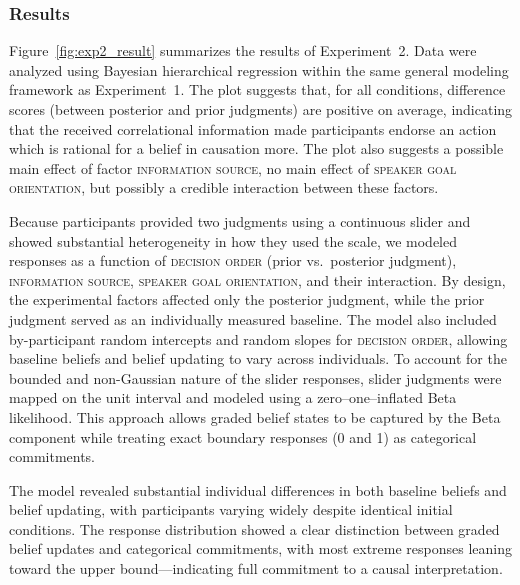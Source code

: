 \documentclass[10pt,letterpaper]{article}
\begin{document}
\subsubsection{Results}



Figure~\ref{fig:exp2_result} summarizes the results of Experiment~2. Data were analyzed using Bayesian hierarchical regression within the same general modeling framework as Experiment~1. 
The plot suggests that, for all conditions, difference scores (between posterior and prior judgments) are positive on average, indicating that the received correlational information made participants endorse an action which is rational for a belief in causation more.
The plot also suggests a possible main effect of factor \textsc{information source}, no main effect of \textsc{speaker goal orientation}, but possibly a credible interaction between these factors.

Because participants provided two judgments using a continuous slider and showed substantial heterogeneity in how they used the scale, we modeled responses as a function of \textsc{decision order} (prior vs.\ posterior judgment), \textsc{information source}, \textsc{speaker goal orientation}, and their interaction. By design, the experimental factors affected only the posterior judgment, while the prior judgment served as an individually measured baseline. The model also included by-participant random intercepts and random slopes for \textsc{decision order}, allowing baseline beliefs and belief updating to vary across individuals. To account for the bounded and non-Gaussian nature of the slider responses, slider judgments were mapped on the unit interval and modeled using a zero--one--inflated Beta likelihood. This approach allows graded belief states to be captured by the Beta component while treating exact boundary responses (0 and 1) as categorical commitments.  

The model revealed substantial individual differences in both baseline beliefs and belief updating, with participants varying widely despite identical initial conditions. The response distribution showed a clear distinction between graded belief updates and categorical commitments, with most extreme responses leaning toward the upper bound—indicating full commitment to a causal interpretation.
\end{document}
